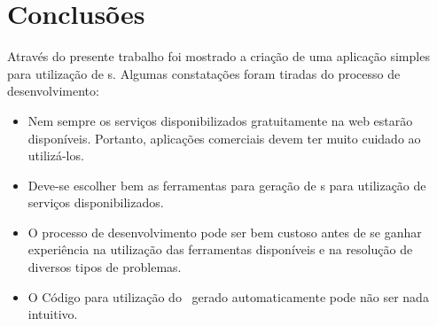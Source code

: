 %

\chapter{Conclusões}

Através do presente trabalho foi mostrado a criação de uma aplicação simples
para utilização de \WebService s. Algumas constatações foram tiradas do processo
de desenvolvimento:

\begin{itemize}
  \item Nem sempre os serviços disponibilizados gratuitamente na web estarão
    disponíveis. Portanto, aplicações comerciais devem ter muito cuidado ao
    utilizá-los.
  \item Deve-se escolher bem as ferramentas para geração de \proxy s para
    utilização de serviços disponibilizados.
  \item O processo de desenvolvimento pode ser bem custoso antes de se ganhar
    experiência na utilização das ferramentas disponíveis e na resolução de
    diversos tipos de problemas.
  \item O Código para utilização do \proxy\ gerado automaticamente pode não ser
    nada intuitivo.
\end{itemize}
